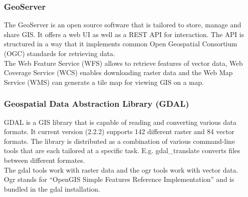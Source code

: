 \subsubsection{GeoServer} \label{sec:GS}
The GeoServer is an open source software that is tailored to store, manage and share GIS. It offers a web UI as well as a REST API for interaction. The API is structured in a way that it implements common Open Geospatial Consortium (OGC) standards for retrieving data.\\
The Web Feature Service (WFS) allows to retrieve features of vector data, Web Coverage Service (WCS) enables downloading raster data and the Web Map Service (WMS) can generate a tile map for viewing GIS on a map.
%

\subsubsection{Geospatial Data Abstraction Library (GDAL)}
\label{sec:gdal}
GDAL is a GIS library that is capable of reading and converting various data formats. It current version (2.2.2) supports 142 different raster and 84 vector formats. The library is distributed as a combination of various command-line tools that are each tailored at a specific task. E.g. gdal\_translate converts files between different formates.\\
The gdal tools work with raster data and the ogr tools work with vector data. Ogr stands for \enquote{OpenGIS Simple Features Reference Implementation} and is bundled in the gdal installation.


